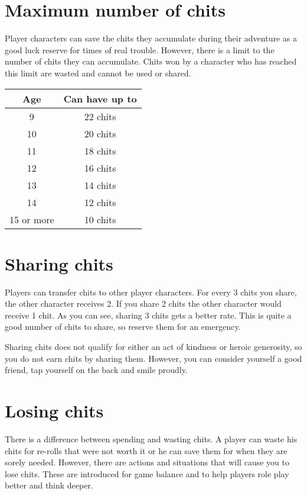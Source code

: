\section{Maximum number of chits}

Player characters can save the chits they accumulate during their
adventure as a good luck reserve for times of real trouble. However,
there is a limit to the number of chits they can accumulate. Chits
won by a character who has reached this limit are wasted and cannot
be used or shared.

\begin{center}
\label{sub:Maximum Number of Chits Table}
\par\end{center}

\begin{longtable}{cc}
\hline
\toprule 
Age & Can have up to\tabularnewline
\midrule
\hline
\endhead
\midrule 
9 & 22 chits\tabularnewline
\midrule 
10 & 20 chits\tabularnewline
\midrule 
11 & 18 chits\tabularnewline
\midrule 
12 & 16 chits\tabularnewline
\midrule 
13 & 14 chits\tabularnewline
\midrule 
14 & 12 chits\tabularnewline
\midrule 
15 or more & 10 chits\tabularnewline
\bottomrule
\end{longtable}


\section{Sharing chits}

Players can transfer chits to other player characters. For every 3
chits you share, the other character receives 2. If you share 2 chits
the other character would receive 1 chit. As you can see, sharing
3 chits gets a better rate. This is quite a good number of chits to
share, so reserve them for an emergency.

Sharing chits does not qualify for either an act of kindness or heroic
generosity, so you do not earn chits by sharing them. However, you
can consider yourself a good friend, tap yourself on the back and
smile proudly.


\section{Losing chits}

There is a difference between spending and wasting chits. A player
can waste his chits for re-rolls that were not worth it or he can
save them for when they are sorely needed. However, there are actions
and situations that will cause you to lose chits. These are introduced
for game balance and to help players role play better and think deeper.

